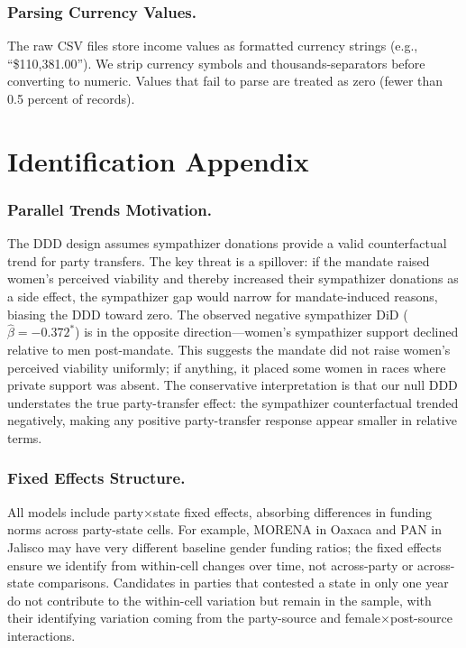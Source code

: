 \documentclass[12pt]{article}
\begin{document}
\subsubsection*{Parsing Currency Values.}
The raw CSV files store income values as formatted currency strings (e.g., ``\$110,381.00''). We strip currency symbols and thousands-separators before converting to numeric. Values that fail to parse are treated as zero (fewer than 0.5 percent of records).

\section{Identification Appendix}

\subsubsection*{Parallel Trends Motivation.}
The DDD design assumes sympathizer donations provide a valid counterfactual trend for party transfers. The key threat is a spillover: if the mandate raised women's perceived viability and thereby increased their sympathizer donations as a side effect, the sympathizer gap would narrow for mandate-induced reasons, biasing the DDD toward zero. The observed negative sympathizer DiD ($\hat{\beta} = -0.372^{*}$) is in the opposite direction---women's sympathizer support declined relative to men post-mandate. This suggests the mandate did not raise women's perceived viability uniformly; if anything, it placed some women in races where private support was absent. The conservative interpretation is that our null DDD understates the true party-transfer effect: the sympathizer counterfactual trended negatively, making any positive party-transfer response appear smaller in relative terms.

\subsubsection*{Fixed Effects Structure.}
All models include party$\times$state fixed effects, absorbing differences in funding norms across party-state cells. For example, MORENA in Oaxaca and PAN in Jalisco may have very different baseline gender funding ratios; the fixed effects ensure we identify from within-cell changes over time, not across-party or across-state comparisons. Candidates in parties that contested a state in only one year do not contribute to the within-cell variation but remain in the sample, with their identifying variation coming from the party-source and female$\times$post-source interactions.
\end{document}
